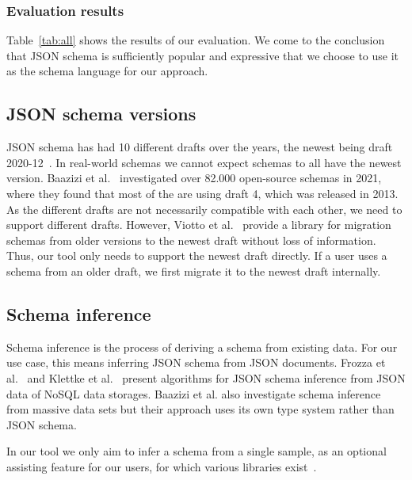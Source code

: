 \documentclass[lettersize,journal]{IEEEtran}
\begin{document}
\subsubsection{Evaluation results}

Table~\ref{tab:all} shows the results of our evaluation. We come to the conclusion that JSON schema is sufficiently popular and expressive that we choose to use it as the schema language for our approach.

\subsection{JSON schema versions}

JSON schema has had 10 different drafts over the years, the newest being draft 2020-12~\cite{jsonschemaJSONSchema}. In real-world schemas we cannot expect schemas to all have the newest version. Baazizi et al.~\cite{baazizi2021empirical} investigated over 82.000 open-source schemas in 2021, where they found that most of the are using draft 4, which was released in 2013. As the different drafts are not necessarily compatible with each other, we need to support different drafts. However, Viotto et al.~\cite{Viotti_Lagoni_2023} provide a library for migration schemas from older versions to the newest draft without loss of information. Thus, our tool only needs to support the newest draft directly. If a user uses a schema from an older draft, we first migrate it to the newest draft internally.

\subsection{Schema inference}

Schema inference is the process of deriving a schema from existing data. For our use case, this means inferring JSON schema from JSON documents. 
Frozza et al.~\cite{8424731} and Klettke et al.~\cite{klettke} present algorithms for JSON schema inference from JSON data of NoSQL data storages. Baazizi et al.\cite{Baazizi2019} also investigate schema inference from massive data sets but their approach uses its own type system rather than JSON schema.

In our tool we only aim to infer a schema from a single sample, as an optional assisting feature for our users, for which various libraries exist~\cite{githubGitHubJsonsystemspublic, githubGitHubSaasquatchjsonschemainferrer, probst_siegel_2023}.
\end{document}
